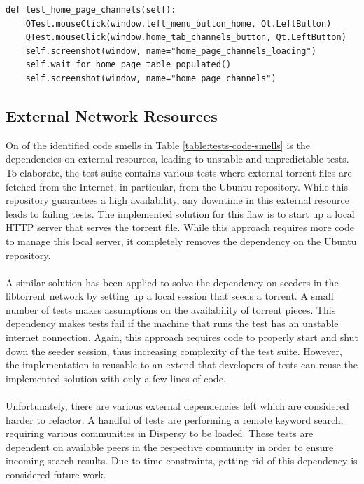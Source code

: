 \begin{lstlisting}[caption={A sample of a test that tests the new Qt Tribler GUI.},label={lst:qtest-sample}]
def test_home_page_channels(self):
	QTest.mouseClick(window.left_menu_button_home, Qt.LeftButton)
	QTest.mouseClick(window.home_tab_channels_button, Qt.LeftButton)
	self.screenshot(window, name="home_page_channels_loading")
	self.wait_for_home_page_table_populated()
	self.screenshot(window, name="home_page_channels")
\end{lstlisting}

\subsection{External Network Resources}
\label{subsec:external-network-resources}
On of the identified code smells in Table \ref{table:tests-code-smells} is the dependencies on external resources, leading to unstable and unpredictable tests. To elaborate, the test suite contains various tests where external torrent files are fetched from the Internet, in particular, from the Ubuntu repository. While this repository guarantees a high availability, any downtime in this external resource leads to failing tests. The implemented solution for this flaw is to start up a local HTTP server that serves the torrent file. While this approach requires more code to manage this local server, it completely removes the dependency on the Ubuntu repository.\\\\
A similar solution has been applied to solve the dependency on seeders in the libtorrent network by setting up a local session that seeds a torrent. A small number of tests makes assumptions on the availability of torrent pieces. This dependency makes tests fail if the machine that runs the test has an unstable internet connection. Again, this approach requires code to properly start and shut down the seeder session, thus increasing complexity of the test suite. However, the implementation is reusable to an extend that developers of tests can reuse the implemented solution with only a few lines of code.\\\\
Unfortunately, there are various external dependencies left which are considered harder to refactor. A handful of tests are performing a remote keyword search, requiring various communities in Dispersy to be loaded. These tests are dependent on available peers in the respective community in order to ensure incoming search results. Due to time constraints, getting rid of this dependency is considered future work.

